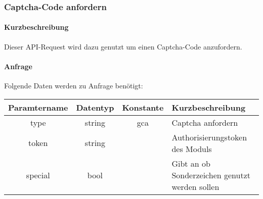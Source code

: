 \subsubsection{Captcha-Code anfordern}
\paragraph{Kurzbeschreibung}Dieser API-Request wird dazu genutzt um einen Captcha-Code anzufordern.
\paragraph{Anfrage}Folgende Daten werden zu Anfrage benötigt:
\begin{table}[H]
	\begin{tabular}{|c|c|c|p{6.5cm}|}
		\hline
		\textbf{Paramtername} & \textbf{Datentyp} & \textbf{Konstante} & \textbf{Kurzbeschreibung}                                                                                               \\ \hline
		type                & string            & gca                & Captcha anfordern \\ \hline
		token               & string            &                    & Authorisierungstoken des Moduls \\ \hline
		special             & bool              &                    & Gibt an ob Sonderzeichen genutzt werden sollen \\ \hline
	\end{tabular}
\end{table}
